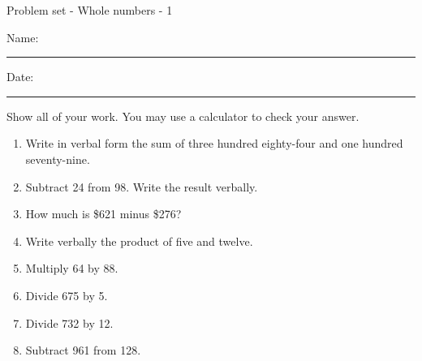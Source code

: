 \documentclass[12pt]{article}
\begin{document}
\pagestyle{empty} %
\begin{center}
          Problem set - Whole numbers - 1 \\[0.5in]
\end{center}
Name: \rule{4in}{0.005in} Date: \rule{1.5in}{0.005in} 
  \vspace{0.25in}

Show all of your work. You may use a calculator to check your answer. 

\begin{enumerate}
\item Write in verbal form the sum of three hundred eighty-four and one hundred seventy-nine.  
  \vspace{0.5in}
  \vspace{0.5in}

\item Subtract 24 from 98. Write the result verbally. 
  \vspace{0.5in}
  \vspace{0.5in}

\item How much is \$621 minus \$276? 
  \vspace{0.5in}
  \vspace{0.5in}

\item Write verbally the product of five and twelve. 
  \vspace{0.5in}
  \vspace{0.5in}
  \vspace{0.5in}

\item Multiply 64 by 88. 
  \vspace{0.5in}
  \vspace{0.5in}
  \vspace{0.5in}

\item Divide 675 by 5. 
  \vspace{0.5in}
  \vspace{0.5in}
  \vspace{0.5in}

\item Divide 732 by 12. 
  \vspace{0.5in}
  \vspace{0.5in}
  \vspace{0.5in}

\item Subtract 961 from 128. 
  \vspace{0.5in}
  \vspace{0.5in}


\end{enumerate}
\end{document}
